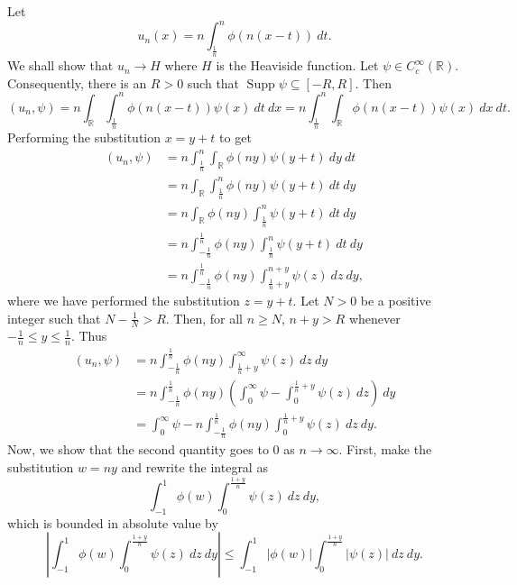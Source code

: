 \documentclass[10pt]{amsart}
\theoremstyle{thmstyle}
\theoremstyle{defstyle}
\newcommand{\R}{\mathbb{R}}
\newcommand{\Supp}{\operatorname{Supp}}
\renewcommand{\le}{\leqslant}
\renewcommand{\ge}{\geqslant}
\begin{document}
Let 
\begin{equation*}
	u_n(x) = n\int_{\frac{1}{n}}^n \phi\left(n(x - t)\right)~dt.
\end{equation*}
We shall show that $u_n\to H$ where $H$ is the Heaviside function. Let $\psi\in C_c^\infty(\R)$. Consequently, there is an $R > 0$ such that $\Supp\psi\subseteq[-R, R]$. Then
\begin{equation*}
	(u_n,\psi) = n\int_{\R}\int_{\frac{1}{n}}^n \phi\left(n(x - t)\right)\psi(x)~dt~dx = n\int_{\frac{1}{n}}^n\int_{\R}\phi\left(n(x - t)\right)\psi(x)~dx~dt.
\end{equation*}
Performing the substitution $x = y + t$ to get
\begin{align*}
	(u_n,\psi) &= n\int_{\frac{1}{n}}^n\int_{\R}\phi(ny)\psi(y + t)~dy~dt\\
	&= n\int_{\R}\int_{\frac{1}{n}}^n \phi(ny)\psi(y + t)~dt~dy\\
	&= n\int_{\R} \phi(ny)\int_{\frac{1}{n}}^n \psi(y + t)~dt~dy\\
	&= n\int_{-\frac{1}{n}}^\frac{1}{n}\phi(ny)\int_{\frac{1}{n}}^n\psi(y + t)~dt~dy\\
	&= n\int_{-\frac{1}{n}}^\frac{1}{n}\phi(ny)\int_{\frac{1}{n} + y}^{n + y}\psi(z)~dz~dy,
\end{align*}
where we have performed the substitution $z = y + t$. Let $N > 0$ be a positive integer such that $N - \frac{1}{N} > R$. Then, for all $n\ge N$, $n + y > R$ whenever $-\frac{1}{n}\le y\le\frac{1}{n}$. Thus
\begin{align*}
	(u_n,\psi) &= n\int_{-\frac{1}{n}}^\frac{1}{n}\phi(ny)\int_{\frac{1}{n} + y}^\infty\psi(z)~dz~dy\\
	&= n\int_{-\frac{1}{n}}^\frac{1}{n}\phi(ny)\left(\int_{0}^\infty\psi - \int_{0}^{\frac{1}{n} + y}\psi(z)~dz\right)~dy\\
	&= \int_{0}^\infty\psi - n\int_{-\frac{1}{n}}^\frac{1}{n}\phi(ny)\int_0^{\frac{1}{n} + y}\psi(z)~dz~dy.
\end{align*}
Now, we show that the second quantity goes to $0$ as $n\to\infty$. First, make the substitution $w = ny$ and rewrite the integral as 
\begin{equation*}
	\int_{-1}^1\phi(w)\int_{0}^{\frac{1 + y}{n}}\psi(z)~dz~dy,
\end{equation*}
which is bounded in absolute value by 
\begin{equation*}
	\left|\int_{-1}^1\phi(w)\int_{0}^{\frac{1 + y}{n}}\psi(z)~dz~dy\right|\le\int_{-1}^{1}|\phi(w)|\int_{0}^\frac{1 + y}{n}|\psi(z)|~dz~dy.
\end{equation*}
\end{document}
